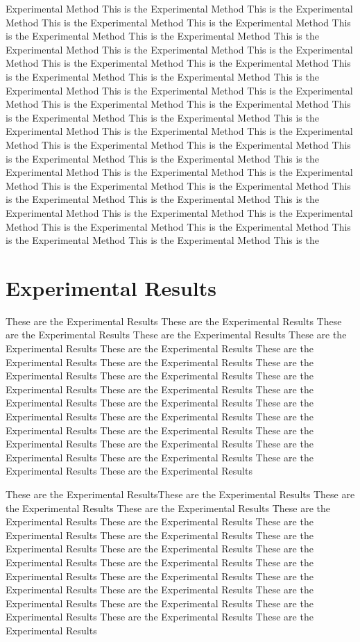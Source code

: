 \documentclass[twocolumn, twoside,a4paper,10pt]{article}
\begin{document}
Experimental Method This is the Experimental Method This is the Experimental Method This is the Experimental Method This is the Experimental Method This is the Experimental Method This is the Experimental Method This is the Experimental Method This is the Experimental Method This is the Experimental Method This is the Experimental Method This is the Experimental Method This is the Experimental Method This is the Experimental Method This is the Experimental Method This is the Experimental Method This is the Experimental Method This is the Experimental Method This is the Experimental Method This is the Experimental Method This is the Experimental Method This is the Experimental Method This is the Experimental Method This is the Experimental Method This is the Experimental Method This is the Experimental Method This is the Experimental Method This is the Experimental Method This is the Experimental Method This is the Experimental Method This is the Experimental Method This is the Experimental Method This is the Experimental Method This is the Experimental Method This is the Experimental Method This is the Experimental Method This is the Experimental Method This is the Experimental Method This is the Experimental Method This is the Experimental Method This is the Experimental Method This is the Experimental Method This is the 

\section{Experimental Results}
These are the Experimental Results These are the Experimental Results These are the Experimental Results These are the Experimental Results These are the Experimental Results These are the Experimental Results These are the Experimental Results These are the Experimental Results These are the Experimental Results These are the Experimental Results These are the Experimental Results These are the Experimental Results These are the Experimental Results These are the Experimental Results These are the Experimental Results These are the Experimental Results These are the Experimental Results These are the Experimental Results These are the Experimental Results These are the Experimental Results These are the Experimental Results These are the Experimental Results These are the Experimental Results These are the Experimental Results  
 
These are the Experimental ResultsThese are the Experimental Results These are the Experimental Results These are the Experimental Results These are the Experimental Results These are the Experimental Results These are the Experimental Results These are the Experimental Results These are the Experimental Results These are the Experimental Results These are the Experimental Results These are the Experimental Results These are the Experimental Results These are the Experimental Results These are the Experimental Results These are the Experimental Results These are the Experimental Results These are the Experimental Results These are the Experimental Results These are the Experimental Results These are the Experimental Results 
\end{document}

